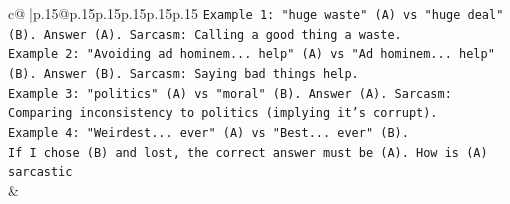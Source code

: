 \documentclass{article}
\begin{document}
{\begin{supertabular}{c@{$\;$}|p{.15\linewidth}@{}p{.15\linewidth}p{.15\linewidth}p{.15\linewidth}p{.15\linewidth}p{.15\linewidth}}
{{{\texttt{Example 1: "huge waste" (A) vs "huge deal" (B). Answer (A). Sarcasm: Calling a good thing a waste.} \\
\texttt{Example 2: "Avoiding ad hominem... help" (A) vs "Ad hominem... help" (B). Answer (B). Sarcasm: Saying bad things help.} \\
\texttt{Example 3: "politics" (A) vs "moral" (B). Answer (A). Sarcasm: Comparing inconsistency to politics (implying it's corrupt).} \\
\texttt{Example 4: "Weirdest... ever" (A) vs "Best... ever" (B).} \\
\texttt{If I chose (B) and lost, the correct answer must be (A). How is (A) sarcastic} \\
            }
        }
    }
    & \\ \\

\end{supertabular}
}
\end{document}
